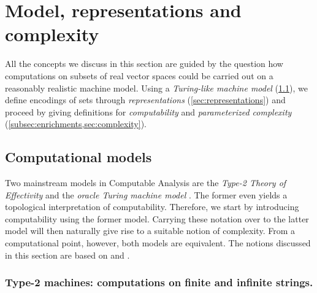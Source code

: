 \documentclass{CSML}
\let\originalleft\left
\let\originalright\right
\renewcommand{\left}{\mathopen{}\mathclose\bgroup\originalleft}
\renewcommand{\right}{\aftergroup\egroup\originalright}
\newcommand{\poly}[1]{\mathrm{poly}\left(#1\right)}
\newcommand{\secref}[1]{\S{#1}}
\begin{document}


\section{Model, representations and complexity} \label{sec:model}


All the concepts we discuss in this section are guided by the question how
computations on subsets of real vector spaces could be carried out on a
reasonably realistic machine model. Using a \emph{Turing-like machine model}
(\cref{sec:models}), we define encodings of sets through \emph{representations}
(\cref{sec:representations}) and proceed by giving definitions for
\emph{computability} and \emph{parameterized complexity}
(\cref{subsec:enrichments,sec:complexity}).


\subsection{Computational models}
	\label{sec:models}

Two mainstream models in Computable Analysis are the \emph{Type-2 Theory
of Effectivity} \cite{Weih00} and the \emph{oracle Turing machine model}
\cite{KF82,Ko91}. The former even yields a topological interpretation of
computability. %
Therefore, we start
by introducing computability using the former model.
Carrying these notation over to the latter model will then naturally give rise
to a suitable notion of complexity.
From a computational point, however, both models are equivalent.
The notions discussed in this section are based on
\cite[\secref{2.1+2.2}]{KawamuraPhD} and \cite[\secref{2}]{KMRZarXiv}.


\subsubsection{Type-2 machines: computations on finite and infinite strings.}

\end{document}
